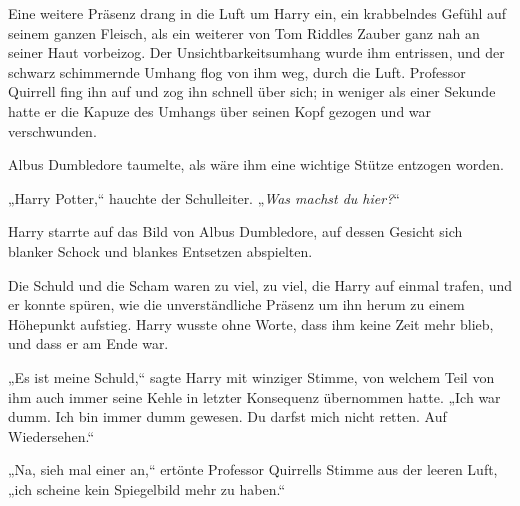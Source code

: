 Eine weitere Präsenz drang in die Luft um Harry ein, ein krabbelndes Gefühl auf seinem ganzen Fleisch, als ein weiterer von Tom Riddles Zauber ganz nah an seiner Haut vorbeizog. Der Unsichtbarkeitsumhang wurde ihm entrissen, und der schwarz schimmernde Umhang flog von ihm weg, durch die Luft.
Professor Quirrell fing ihn auf und zog ihn schnell über sich; in weniger als einer Sekunde hatte er die Kapuze des Umhangs über seinen Kopf gezogen und war verschwunden.

Albus Dumbledore taumelte, als wäre ihm eine wichtige Stütze entzogen worden.

„Harry Potter,“ hauchte der Schulleiter. „\emph{Was machst du hier?}“

Harry starrte auf das Bild von Albus Dumbledore, auf dessen Gesicht sich blanker Schock und blankes Entsetzen abspielten.

Die Schuld und die Scham waren zu viel, zu viel, die Harry auf einmal trafen, und er konnte spüren, wie die unverständliche Präsenz um ihn herum zu einem Höhepunkt aufstieg. Harry wusste ohne Worte, dass ihm keine Zeit mehr blieb, und dass er am Ende war.

„Es ist meine Schuld,“ sagte Harry mit winziger Stimme, von welchem Teil von ihm auch immer seine Kehle in letzter Konsequenz übernommen hatte. „Ich war dumm. Ich bin immer dumm gewesen. Du darfst mich nicht retten. Auf Wiedersehen.“

„Na, sieh mal einer an,“ ertönte Professor Quirrells Stimme aus der leeren Luft, „ich scheine kein Spiegelbild mehr zu haben.“

